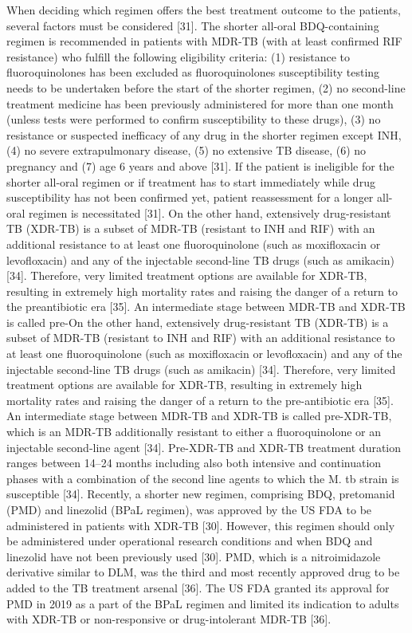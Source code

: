 \documentclass{article}
\begin{document}
When deciding which regimen offers the best treatment outcome to the patients, several factors must be considered [31]. The shorter all-oral BDQ-containing regimen is recommended in patients with MDR-TB (with at least confirmed RIF resistance) who fulfill the following eligibility criteria: (1) resistance to fluoroquinolones has been excluded as fluoroquinolones susceptibility testing needs to be undertaken before the start of the shorter regimen, (2) no second-line treatment medicine has been previously administered for more than one month (unless tests were performed to confirm susceptibility to these drugs), (3) no resistance or suspected inefficacy of any drug in the shorter regimen except INH, (4) no severe extrapulmonary disease, (5) no extensive TB disease, (6) no pregnancy and (7) age 6 years and above [31]. If the patient is ineligible for the shorter all-oral regimen or if treatment has to start immediately while drug susceptibility has not been confirmed yet, patient reassessment for a longer all-oral regimen is necessitated [31]. On the other hand, extensively drug-resistant TB (XDR-TB) is a subset of MDR-TB (resistant to INH and RIF) with an additional resistance to at least one fluoroquinolone (such as moxifloxacin or levofloxacin) and any of the injectable second-line TB drugs (such as amikacin) [34]. Therefore, very limited treatment options are available for XDR-TB, resulting in extremely high mortality rates and raising the danger of a return to the preantibiotic era [35]. An intermediate stage between MDR-TB and XDR-TB is called pre-On the other hand, extensively drug-resistant TB (XDR-TB) is a subset of MDR-TB (resistant to INH and RIF) with an additional resistance to at least one fluoroquinolone (such as moxifloxacin or levofloxacin) and any of the injectable second-line TB drugs (such as amikacin) [34]. Therefore, very limited treatment options are available for XDR-TB, resulting in extremely high mortality rates and raising the danger of a return to the pre-antibiotic era [35]. An intermediate stage between MDR-TB and XDR-TB is called pre-XDR-TB, which is an MDR-TB additionally resistant to either a fluoroquinolone or an injectable second-line agent [34]. Pre-XDR-TB and XDR-TB treatment duration ranges between 14–24 months including also both intensive and continuation phases with a combination of the second line agents to which the M. tb strain is susceptible [34]. Recently, a shorter new regimen, comprising BDQ, pretomanid (PMD) and linezolid (BPaL regimen), was approved by the US FDA to be administered in patients with XDR-TB [30]. However, this regimen should only be administered under operational research conditions and when BDQ and linezolid have not been previously used [30]. PMD, which is a nitroimidazole derivative similar to DLM, was the third and most recently approved drug to be added to the TB treatment arsenal [36]. The US FDA granted its approval for PMD in 2019 as a part of the BPaL regimen and limited its indication to adults with XDR-TB or non-responsive or drug-intolerant MDR-TB [36].
\end{document}
